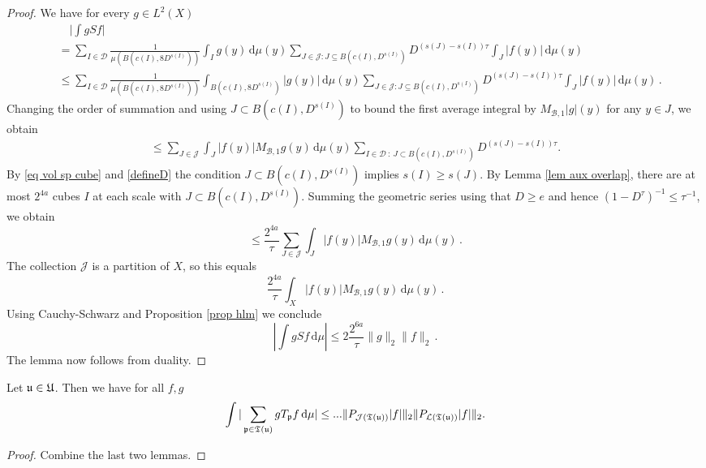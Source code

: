 \begin{proof}
    We have for every $g \in L^2(X)$
    \begin{align*}
        &\quad \big|\int g Sf\big|\\
        &= \sum_{I\in\mathcal{D}} \frac{1}{\mu(B(c(I), 8D^{s(I)}))} \int_I g(y) \, \mathrm{d}\mu(y) \sum_{J\in \mathcal{J}:J\subseteq B(c(I), D^{s(I)})} D^{(s(J)-s(I))\tau}\int_J |f(y)| \,\mathrm{d}\mu(y)\\
        &\le \sum_{I\in\mathcal{D}} \frac{1}{\mu(B(c(I), 8D^{s(I)}))} \int_{B(c(I), 8D^{s(I)})} |g(y)| \, \mathrm{d}\mu(y) \sum_{J\in \mathcal{J}:J\subseteq B(c(I), D^{s(I)})} D^{(s(J)-s(I))\tau}\int_J |f(y)| \,\mathrm{d}\mu(y)\,.
    \end{align*}
    Changing the order of summation and using $J \subset B(c(I), D^{s(I)})$ to bound the first average integral by $M_{\mathcal{B},1}|g|(y)$ for any $y \in J$, we obtain
    \begin{align*}
        \le \sum_{J\in\mathcal{J}}\int_J|f(y)|  M_{\mathcal{B},1}g(y) \, \mathrm{d}\mu(y) \sum_{I \in \mathcal{D} \ : \ J\subset B(c(I), D^{s(I)})} D^{(s(J)-s(I))\tau}.
    \end{align*}
    By \eqref{eq vol sp cube} and \eqref{defineD} the condition $J \subset B(c(I), D^{s(I)})$ implies $s(I) \ge s(J)$. By Lemma \ref{lem aux overlap}, there are at most $2^{4a}$ cubes $I$ at each scale with $J \subset B(c(I), D^{s(I)})$. Summing the geometric series using that $D \ge e$ and hence $(1 - D^\tau)^{-1} \le \tau^{-1}$, we obtain
    $$
        \le \frac{2^{4a}}{\tau} \sum_{J\in\mathcal{J}}\int_J|f(y)|  M_{\mathcal{B},1}g(y) \, \mathrm{d}\mu(y)\,.
    $$
    The collection $\mathcal{J}$ is a partition of $X$, so this equals
    $$
        \frac{2^{4a}}{\tau} \int_X|f(y)|  M_{\mathcal{B},1}g(y) \, \mathrm{d}\mu(y)\,.
    $$
    Using Cauchy-Schwarz and Proposition \ref{prop hlm} we conclude
    $$
        \left|\int g Sf \, \mathrm{d}\mu \right| \le  2\frac{2^{6a}}{\tau} \|g\|_2\|f\|_2\,.
    $$
    The lemma now follows from duality. 
\end{proof}

\begin{lemma}
    \label{TreeEstimate}
    Let $\mathfrak u \in \mathfrak U$.
    Then we have for all $f, g$
    \begin{equation}
        \label{eq tree est}
        \int |\sum_{\mathfrak p \in \mathfrak T(\mathfrak u)} gT_{\mathfrak p}f \, \mathrm{d}\mu |\le ... \|P_{\mathcal{J}(\mathfrak T(\mathfrak u))}|f|\|_{2}\|P_{\mathcal{L}(\mathfrak T(\mathfrak u))}|f|\|_{2}.
    \end{equation}
\end{lemma}

\begin{proof}
    Combine the last two lemmas.
\end{proof}

\printbibliography
